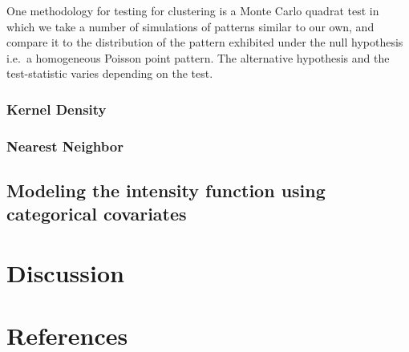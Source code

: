 \documentclass[12pt]{article}
\begin{document}
One methodology for testing for clustering is a Monte Carlo quadrat test in which we take a number of simulations of patterns similar to our own, and compare it to the distribution of the pattern exhibited under the null hypothesis i.e.~a homogeneous Poisson point pattern. The alternative hypothesis and the test-statistic varies depending on the test.

\begin{table}[!h]
\centering
{}
\end{table}

\hypertarget{kernel-density}{%
\subsubsection{Kernel Density}\label{kernel-density}}

\hypertarget{nearest-neighbor}{%
\subsubsection{Nearest Neighbor}\label{nearest-neighbor}}

\hypertarget{modeling-the-intensity-function-using-categorical-covariates}{%
\subsection{Modeling the intensity function using categorical covariates}\label{modeling-the-intensity-function-using-categorical-covariates}}

\hypertarget{discussion}{%
\section{Discussion}\label{discussion}}

\newpage

\hypertarget{references}{%
\section{References}\label{references}}

\newpage



\end{document}
